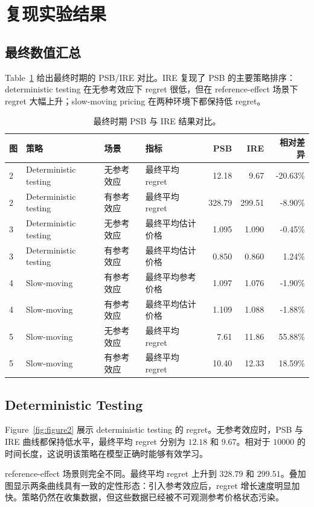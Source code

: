 \documentclass[conference]{../../LaTex_Template/IEEEtran}
\begin{document}
\section{复现实验结果}
\subsection{最终数值汇总}
Table~\ref{tab:comparison} 给出最终时期的 PSB/IRE 对比。IRE 复现了 PSB 的主要策略排序：deterministic testing 在无参考效应下 regret 很低，但在 reference-effect 场景下 regret 大幅上升；slow-moving pricing 在两种环境下都保持低 regret。

\begin{table}[t]
\centering
\caption{最终时期 PSB 与 IRE 结果对比。}
\label{tab:comparison}
\begin{tabular}{llllrrr}
\hline
图 & 策略 & 场景 & 指标 & PSB & IRE & 相对差异\\
\hline
2 & Deterministic testing & 无参考效应 & 最终平均 regret & 12.18 & 9.67 & -20.63\%\\
2 & Deterministic testing & 有参考效应 & 最终平均 regret & 328.79 & 299.51 & -8.90\%\\
3 & Deterministic testing & 无参考效应 & 最终平均估计价格 & 1.095 & 1.090 & -0.45\%\\
3 & Deterministic testing & 有参考效应 & 最终平均估计价格 & 0.850 & 0.860 & 1.24\%\\
4 & Slow-moving & 有参考效应 & 最终平均参考价格 & 1.097 & 1.076 & -1.90\%\\
4 & Slow-moving & 有参考效应 & 最终平均估计价格 & 1.109 & 1.088 & -1.88\%\\
5 & Slow-moving & 无参考效应 & 最终平均 regret & 7.61 & 11.86 & 55.88\%\\
5 & Slow-moving & 有参考效应 & 最终平均 regret & 10.40 & 12.33 & 18.59\%\\
\hline
\end{tabular}
\end{table}

\subsection{Deterministic Testing}
Figure~\ref{fig:figure2} 展示 deterministic testing 的 regret。无参考效应时，PSB 与 IRE 曲线都保持低水平，最终平均 regret 分别为 $12.18$ 和 $9.67$。相对于 $10000$ 的时间长度，这说明该策略在模型正确时能够有效学习。

reference-effect 场景则完全不同。最终平均 regret 上升到 $328.79$ 和 $299.51$。叠加图显示两条曲线具有一致的定性形态：引入参考效应后，regret 增长速度明显加快。策略仍然在收集数据，但这些数据已经被不可观测参考价格状态污染。
\end{document}
